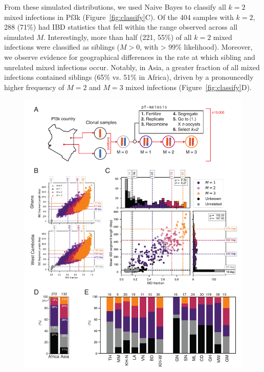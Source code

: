 \documentclass[9pt,lineno]{elife}
\begin{document}
From these simulated distributions, we used Naive Bayes to classify all $k=2$ mixed infections in Pf3k (Figure~\ref{fig:classify}C).  Of the 404 samples with $k=2$, 288 (71\%) had IBD statistics that fell within the range observed across all simulated $M$. Interestingly, more than half (221, 55\%) of all $k=2$ mixed infections were classified as siblings ($M > 0$, with > 99\% likelihood).  Moreover, we observe evidence for geographical differences in the rate at which sibling and unrelated mixed infections occur. Notably, in Asia, a greater fraction of all mixed infections contained siblings (65\% vs. 51\% in Africa), driven by a pronouncedly higher frequency of $M=2$ and $M=3$ mixed infections (Figure~\ref{fig:classify}D).

\begin{figure}[htp]
  \begin{center}
  \includegraphics[width=\textwidth]{Fig4-v3.pdf}

\end{center}
\end{figure}
\end{document}
